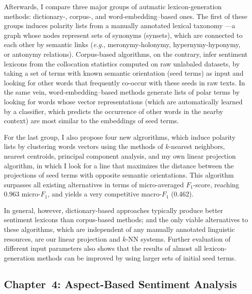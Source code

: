 \documentclass[11pt]{article}
\newcommand{\eg}{\textit{e.g.},}
\newcommand{\F}[0]{$F_1$}
\renewcommand{\cite}{\citep}
\begin{document}
Afterwards, I compare three major groups of autmatic
lexicon-generation methods: dictionary-, corpus-, and
word-embedding--based ones.  The first of these groups induces
polarity lists from a manually annotated lexical taxonomy
\cite[\textsc{GermaNet}; ][]{Hamp:97}---a graph whose nodes represent
sets of synonyms (synsets), which are connected to each other by
semantic links (\eg{} meronymy-holonymy, hypernymy-hyponymy, or
antonymy relations).  Corpus-based algorithms, on the contrary, infer
sentiment lexicons from the collocation statistics computed on raw
unlabaled datasets, by taking a set of terms with known semantic
orientation (seed terms) as input and looking for other words that
frequently co-occur with these seeds in raw texts.  In the same vein,
word-embedding--based methods generate lists of polar terms by looking
for words whose vector representations (which are automatically
learned by a classifier, which predicts the occurrence of other words
in the nearby context) are most similar to the embeddings of seed
terms.

For the last group, I also propose four new algrorithms, which induce
polarity lists by clustering words vectors using the methods of
$k$-nearest neighbors, nearest centroids, principal component
analysis, and my own linear projection algorithm, in which I look for
a line that maximizes the distance between the projections of seed
terms with opposite semantic orientations.  This algorithm surpasses
all existing alternatives in terms of micro-averaged \F{}-score,
reaching 0.963 micro-\F{}, and yields a very competitive macro-\F{}
(0.462).

In general, however, dictionary-based approaches typically produce
better sentiment lexicons than corpus-based methods; and the only
viable alternatives to these algorithms, which are independent of any
manually annotated linguistic resources, are our linear projection and
$k$-NN systems.  Further evaluation of different input parameters also
shows that the results of almost all lexicon-generation methods can be
improved by using larger sets of initial seed terms.

\subsection{Chapter~4: Aspect-Based Sentiment Analysis}
\end{document}
